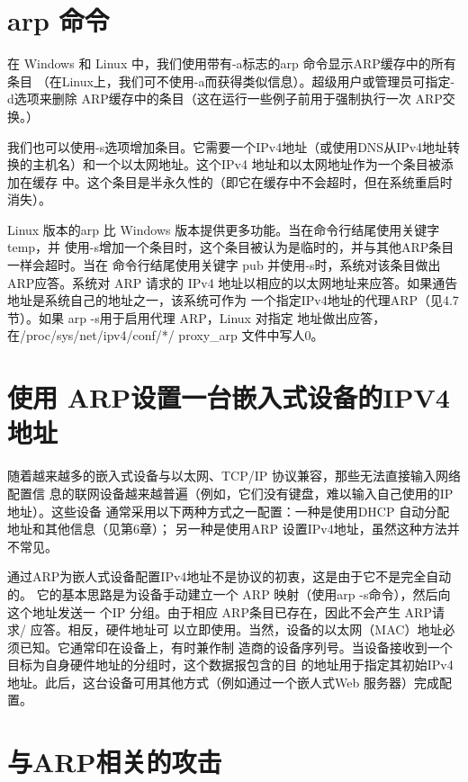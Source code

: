 \section{arp 命令}

在 Windows 和 Linux 中，我们使用带有-a标志的arp 命令显示ARP缓存中的所有条目
（在Linux上，我们可不使用-a而获得类似信息）。超级用户或管理员可指定-d选项来删除
ARP缓存中的条目（这在运行一些例子前用于强制执行一次 ARP交换。）

我们也可以使用-s选项增加条目。它需要一个IPv4地址（或使用DNS从IPv4地址转
换的主机名）和一个以太网地址。这个IPv4 地址和以太网地址作为一个条目被添加在缓存
中。这个条目是半永久性的（即它在缓存中不会超时，但在系统重启时消失）。

Linux 版本的arp 比 Windows 版本提供更多功能。当在命令行结尾使用关键字 temp，并
使用-s增加一个条目时，这个条目被认为是临时的，并与其他ARP条目一样会超时。当在
命令行结尾使用关键字 pub 并使用-s时，系统对该条目做出 ARP应答。系统对 ARP 请求的
IPv4 地址以相应的以太网地址来应答。如果通告地址是系统自己的地址之一，该系统可作为
一个指定IPv4地址的代理ARP（见4.7节）。如果 arp -s用于启用代理 ARP，Linux 对指定
地址做出应答，在/proc/sys/net/ipv4/conf/*/ proxy\_arp 文件中写人0。

\section{使用 ARP设置一台嵌入式设备的IPV4 地址}

随着越来越多的嵌入式设备与以太网、TCP/IP 协议兼容，那些无法直接输入网络配置信
息的联网设备越来越普遍（例如，它们没有键盘，难以输入自己使用的IP地址）。这些设备
通常采用以下两种方式之一配置：一种是使用DHCP 自动分配地址和其他信息（见第6章）；
另一种是使用ARP 设置IPv4地址，虽然这种方法并不常见。

通过ARP为嵌人式设备配置IPv4地址不是协议的初衷，这是由于它不是完全自动的。
它的基本思路是为设备手动建立一个 ARP 映射（使用arp -s命令），然后向这个地址发送一
个IP 分组。由于相应 ARP条目已存在，因此不会产生 ARP请求/ 应答。相反，硬件地址可
以立即使用。当然，设备的以太网（MAC）地址必须已知。它通常印在设备上，有时兼作制
造商的设备序列号。当设备接收到一个目标为自身硬件地址的分组时，这个数据报包含的目
的地址用于指定其初始IPv4地址。此后，这台设备可用其他方式（例如通过一个嵌人式Web
服务器）完成配置。

\section{与ARP相关的攻击}

